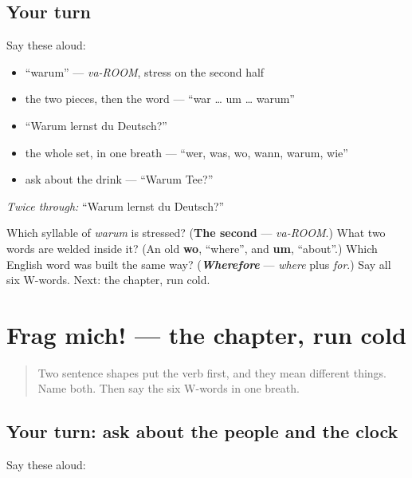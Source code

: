 \subsection*{Your turn}
Say these aloud:

\begin{itemize}
\raggedright
  \item \textquotedblleft{}warum\textquotedblright{} — \emph{va-ROOM}, stress on the second half
  \item the two pieces, then the word — \textquotedblleft{}war … um … warum\textquotedblright{}
  \item \textquotedblleft{}Warum lernst du Deutsch?\textquotedblright{}
  \item the whole set, in one breath — \textquotedblleft{}wer, was, wo, wann, warum, wie\textquotedblright{}
  \item ask about the drink — \textquotedblleft{}Warum Tee?\textquotedblright{}
\end{itemize}

\emph{Twice through:} \textquotedblleft{}Warum lernst du Deutsch?\textquotedblright{}

\begin{tcolorbox}[breakable,colback=teal!4,colframe=teal!35!black,title={Before you move on}]
Which syllable of \emph{warum} is stressed? (\textbf{The second} — \emph{va-ROOM}.) What two words are welded inside it? (An old \textbf{wo}, \textquotedblleft{}where\textquotedblright{}, and \textbf{um}, \textquotedblleft{}about\textquotedblright{}.) Which English word was built the same way? (\emph{\textbf{Wherefore}} — \emph{where} plus \emph{for}.) Say all six W-words. Next: the chapter, run cold.
\end{tcolorbox}
\section[Practice]{Frag mich! — the chapter, run cold}

\label{lesson:GE-R33-frag-mich}



\begin{quote}
Two sentence shapes put the verb first, and they mean different things. Name both. Then say the six W-words in one breath.
\end{quote}

\subsection*{Your turn: ask about the people and the clock}
Say these aloud:

